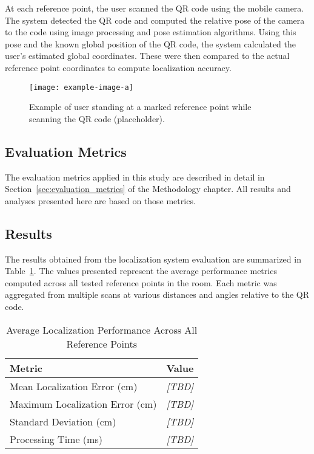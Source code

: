 At each reference point, the user scanned the QR code using the mobile camera. The system detected the QR code and computed the relative pose of the camera to the code using image processing and pose estimation algorithms. Using this pose and the known global position of the QR code, the system calculated the user’s estimated global coordinates. These were then compared to the actual reference point coordinates to compute localization accuracy.

\begin{figure}[h]
	\centering
	\texttt{[image: example-image-a]}
	\caption{Example of user standing at a marked reference point while scanning the QR code (placeholder).}
	\label{fig:procedure_scan}
\end{figure}

\subsection{Evaluation Metrics}

The evaluation metrics applied in this study are described in detail in Section~\ref{sec:evaluation_metrics} of the Methodology chapter. All results and analyses presented here are based on those metrics.

\subsection{Results}

The results obtained from the localization system evaluation are summarized in Table~\ref{tab:localization_metrics}. The values presented represent the average performance metrics computed across all tested reference points in the room. Each metric was aggregated from multiple scans at various distances and angles relative to the QR code.

\begin{table}[h]
	\centering
	\caption{Average Localization Performance Across All Reference Points}
	\label{tab:localization_metrics}
	\begin{tabular}{|l|c|}
		\hline
		\textbf{Metric} & \textbf{Value} \\
		\hline
		Mean Localization Error (cm) & \textit{[TBD]} \\
		Maximum Localization Error (cm) & \textit{[TBD]} \\
		Standard Deviation (cm) & \textit{[TBD]} \\
		Processing Time (ms) & \textit{[TBD]} \\
		\hline
	\end{tabular}
\end{table}

